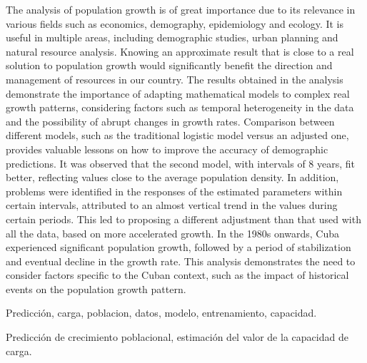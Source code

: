 \documentclass[a4paper,10pt,twocolumn]{article}
\begin{document}
\vspace{0.5cm}

\begin{enabstract}

	The analysis of population growth is of great importance due to its relevance in various fields such as economics, demography, epidemiology and ecology. It is useful in multiple areas, including demographic studies, urban planning and natural resource analysis. Knowing an approximate result that is close to a real solution to population growth would significantly benefit the direction and management of resources in our country. The results obtained in the analysis demonstrate the importance of adapting mathematical models to complex real growth patterns, considering factors such as temporal heterogeneity in the data and the possibility of abrupt changes in growth rates. Comparison between different models, such as the traditional logistic model versus an adjusted one, provides valuable lessons on how to improve the accuracy of demographic predictions. It was observed that the second model, with intervals of 8 years, fit better, reflecting values ​​close to the average population density. In addition, problems were identified in the responses of the estimated parameters within certain intervals, attributed to an almost vertical trend in the values ​​during certain periods. This led to proposing a different adjustment than that used with all the data, based on more accelerated growth. In the 1980s onwards, Cuba experienced significant population growth, followed by a period of stabilization and eventual decline in the growth rate. This analysis demonstrates the need to consider factors specific to the Cuban context, such as the impact of historical events on the population growth pattern.
\end{enabstract}

\begin{keywords}
	Predicción,
	carga,
	poblacion,
	datos,
	modelo,
	entrenamiento,
	capacidad.
\end{keywords}

\begin{topics}
	Predicción de crecimiento poblacional, estimación del valor de la capacidad de carga.
\end{topics}
\end{document}
